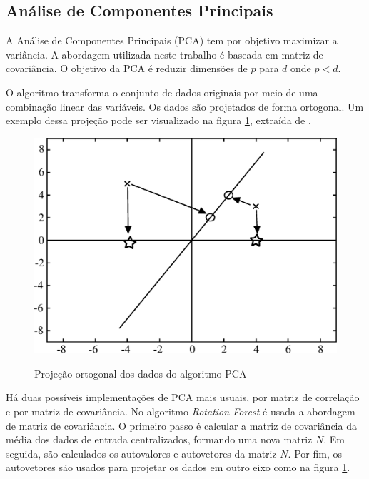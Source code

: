 \subsection{Análise de Componentes Principais}\label{SUBSECTION_PCA}
A Análise de Componentes Principais (PCA) tem por objetivo maximizar a variância. A abordagem utilizada neste trabalho é  baseada em matriz de covariância. O objetivo da PCA é reduzir dimensões de $p$ para $d$ onde $p < d$.

O algoritmo transforma o conjunto de dados originais por meio de uma combinação linear das variáveis. Os dados são projetados de forma ortogonal. Um exemplo dessa projeção pode ser visualizado na figura \ref{figura01_Projecao_PCA}, extraída de .
\begin{figure}[!htp]
	\centering
	\caption{Projeção ortogonal dos dados do algoritmo PCA}
	\includegraphics[height=8cm,width=12cm]{./secoes/conceitosFundamentais/pics/img/figura01_Projecao_PCA.eps}
	\vspace{0.1cm}
	\label{figura01_Projecao_PCA}
\end{figure}

Há duas possíveis implementações de PCA mais usuais, por matriz de correlação e por matriz de covariância. No algoritmo \emph{Rotation Forest} é usada a abordagem de matriz de covariância. O primeiro passo é calcular a matriz de covariância da média dos dados de entrada centralizados, formando uma nova matriz \(N\). Em seguida, são calculados os autovalores e autovetores da matriz \(N\). Por fim, os autovetores são usados para projetar os dados em outro eixo como na figura \ref{figura01_Projecao_PCA}.

